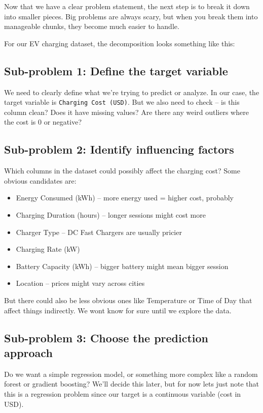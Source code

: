 \documentclass[12pt, a4paper]{article}
\begin{document}
Now that we have a clear problem statement, the next step is to break it down into smaller pieces. Big problems are always scary, but when you break them into manageable chunks, they become much easier to handle.

For our EV charging dataset, the decomposition looks something like this:

\subsection{Sub-problem 1: Define the target variable}

We need to clearly define what we're trying to predict or analyze. In our case, the target variable is \texttt{Charging Cost (USD)}. But we also need to check -- is this column clean? Does it have missing values? Are there any weird outliers where the cost is 0 or negative?

\subsection{Sub-problem 2: Identify influencing factors}

Which columns in the dataset could possibly affect the charging cost? Some obvious candidates are:
\begin{itemize}
    \item Energy Consumed (kWh) -- more energy used = higher cost, probably
    \item Charging Duration (hours) -- longer sessions might cost more
    \item Charger Type -- DC Fast Chargers are usually pricier
    \item Charging Rate (kW)
    \item Battery Capacity (kWh) -- bigger battery might mean bigger session
    \item Location -- prices might vary across cities
\end{itemize}

But there could also be less obvious ones like Temperature or Time of Day that affect things indirectly. We wont know for sure until we explore the data.

\subsection{Sub-problem 3: Choose the prediction approach}

Do we want a simple regression model, or something more complex like a random forest or gradient boosting? We'll decide this later, but for now lets just note that this is a regression problem since our target is a continuous variable (cost in USD).
\end{document}
